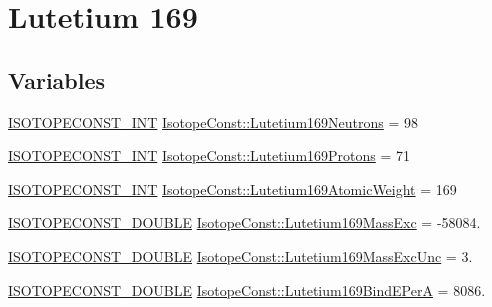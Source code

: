 \hypertarget{group___isotope_const-_lutetium-_lu169}{}\section{Lutetium 169}
\label{group___isotope_const-_lutetium-_lu169}
\subsection*{Variables}
\begin{DoxyCompactItemize}
\item 
\mbox{\hyperlink{group___isotope_const-_macros_ga5f18360b3e99483a35c32d789e62621c}{I\+S\+O\+T\+O\+P\+E\+C\+O\+N\+S\+T\+\_\+\+I\+NT}} \mbox{\hyperlink{group___isotope_const-_lutetium-_lu169_ga5642f8080d0f102e8a7822205dd384b2}{Isotope\+Const\+::\+Lutetium169\+Neutrons}} = 98
\item 
\mbox{\hyperlink{group___isotope_const-_macros_ga5f18360b3e99483a35c32d789e62621c}{I\+S\+O\+T\+O\+P\+E\+C\+O\+N\+S\+T\+\_\+\+I\+NT}} \mbox{\hyperlink{group___isotope_const-_lutetium-_lu169_ga56f275e3777a44627ee0747d5f3c0879}{Isotope\+Const\+::\+Lutetium169\+Protons}} = 71
\item 
\mbox{\hyperlink{group___isotope_const-_macros_ga5f18360b3e99483a35c32d789e62621c}{I\+S\+O\+T\+O\+P\+E\+C\+O\+N\+S\+T\+\_\+\+I\+NT}} \mbox{\hyperlink{group___isotope_const-_lutetium-_lu169_ga70d0a9b41b7775eb6a881f2b6000f468}{Isotope\+Const\+::\+Lutetium169\+Atomic\+Weight}} = 169
\item 
\mbox{\hyperlink{group___isotope_const-_macros_ga8f45a7272ce02c0b4c65c44636ed719a}{I\+S\+O\+T\+O\+P\+E\+C\+O\+N\+S\+T\+\_\+\+D\+O\+U\+B\+LE}} \mbox{\hyperlink{group___isotope_const-_lutetium-_lu169_gaaee4a6913d0d72e26d43561f8e7608a4}{Isotope\+Const\+::\+Lutetium169\+Mass\+Exc}} = -\/58084.
\item 
\mbox{\hyperlink{group___isotope_const-_macros_ga8f45a7272ce02c0b4c65c44636ed719a}{I\+S\+O\+T\+O\+P\+E\+C\+O\+N\+S\+T\+\_\+\+D\+O\+U\+B\+LE}} \mbox{\hyperlink{group___isotope_const-_lutetium-_lu169_ga10638174ceaec23074c34c8fe047eea9}{Isotope\+Const\+::\+Lutetium169\+Mass\+Exc\+Unc}} = 3.
\item 
\mbox{\hyperlink{group___isotope_const-_macros_ga8f45a7272ce02c0b4c65c44636ed719a}{I\+S\+O\+T\+O\+P\+E\+C\+O\+N\+S\+T\+\_\+\+D\+O\+U\+B\+LE}} \mbox{\hyperlink{group___isotope_const-_lutetium-_lu169_ga0513bad9b7589cd2629f6a3401faa204}{Isotope\+Const\+::\+Lutetium169\+Bind\+E\+PerA}} = 8086.
\item 

\end{DoxyCompactItemize}

